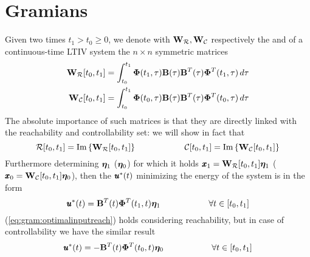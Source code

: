 \section{Gramians}
	Given two times $t_1 > t_0 \geq 0$, we denote with $\mathbf{W}_\mathcal R,\mathbf{W}_\mathcal C$ respectively the  and  of a continuous-time LTIV system the $n \times n$ symmetric matrices
	\begin{equation} \label{eq:gram:tvgramians}
	\begin{aligned}
		\mathbf{W}_\mathcal R[t_0,t_1] & = \int_{t_0}^{t_1} \mathbf{\Phi}(t_1,\tau) \mathbf{B}(\tau) \mathbf{B}^T(\tau) \mathbf{\Phi}^T(t_1,\tau) \, d\tau \\
		\mathbf{W}_\mathcal C[t_0,t_1] & = \int_{t_0}^{t_1} \mathbf{\Phi}(t_0,\tau) \mathbf{B}(\tau) \mathbf{B}^T(\tau) \mathbf{\Phi}^T(t_0,\tau) \, d\tau  
	\end{aligned}
	\end{equation}
	The absolute importance of such matrices is that they are directly linked with the reachability and controllability set: we will show in fact that
	\begin{equation} \label{eq:gram:temp1}
		\mathcal R[t_0,t_1] = \textrm{Im}\left\{\mathbf{W}_\mathcal R[t_0,t_1]\right\} \hspace{2cm} \mathcal C[t_0,t_1] = \textrm{Im}\left\{\mathbf{W}_\mathcal C[t_0,t_1]\right\}
	\end{equation}
	Furthermore determining $\boldsymbol{\eta}_1$ ($\boldsymbol{\eta}_0$) for which it holds $\pmb{x}_1 = \mathbf{W}_\mathcal R[t_0,t_1] \boldsymbol{\eta}_1$ ($\pmb{x}_0 = \mathbf{W}_\mathcal C [t_0,t_1] \boldsymbol{\eta}_0$), then the   $\pmb{u}^*(t)$ minimizing the energy of the system is in the form
	\begin{equation} \label{eq:gram:optimalinputreach}
		\pmb{u}^*(t)  =\mathbf{B}^T(t) \mathbf{\Phi}^T(t_1,t) \boldsymbol{\eta}_1 \hspace{2cm} \forall t \in [t_0,t_1]
	\end{equation}
	(\ref{eq:gram:optimalinputreach}) holds considering reachability, but in case of controllability we have the similar result
	\begin{equation} \label{eq:gram:optimalinputrtr}
		\pmb{u}^*(t)  =-\mathbf{B}^T(t) \mathbf{\Phi}^T(t_0,t) \boldsymbol{\eta}_0 \hspace{2cm} \forall t \in [t_0,t_1]
	\end{equation}
	
